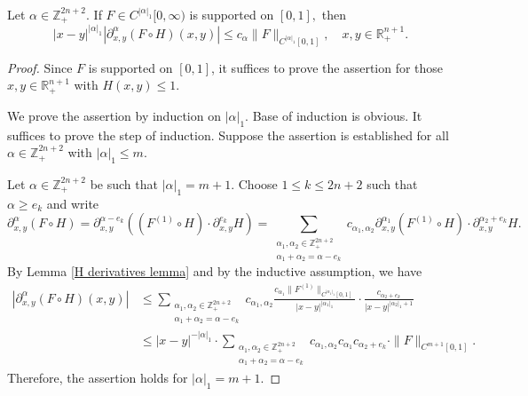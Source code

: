 \documentclass[12pt]{amsart}
\begin{document}
\begin{lemma}\label{pre-parcet lemma} Let $\alpha\in\mathbb{Z}^{2n+2}_+.$ If $F\in C^{|\alpha|_1}[0,\infty)$ is supported on $[0,1],$ then
$$|x-y|^{|\alpha|_1}|\partial_{x,y}^{\alpha}(F\circ H)(x,y)|\leq c_{\alpha}\|F\|_{C^{|\alpha|_1}[0,1]},\quad x,y\in\mathbb{R}^{n+1}_+.$$
\end{lemma}
\begin{proof}
Since $F$ is supported on $[0,1]$, it suffices to prove the assertion for those $x,y\in\mathbb{R}^{n+1}_+$ with $H(x,y)\leq 1.$

We prove the assertion by induction on $|\alpha|_1.$ Base of induction is obvious. It suffices to prove the step of induction. Suppose the assertion is established for all $\alpha\in\mathbb{Z}^{2n+2}_+$ with $|\alpha|_1\leq m.$
	
Let $\alpha\in\mathbb{Z}^{2n+2}_+$ be such that $|\alpha|_1=m+1.$ Choose $1\leq k\leq 2n+2$ such that $\alpha\geq e_k$ and write
$$\partial_{x,y}^{\alpha}(F\circ H)=\partial_{x,y}^{\alpha-e_k}((F^{(1)}\circ H)\cdot \partial_{x,y}^{e_k}H)=\sum_{\substack{\alpha_1,\alpha_2\in\mathbb{Z}^{2n+2}_+\\ \alpha_1+\alpha_2=\alpha-e_k}}c_{\alpha_1,\alpha_2}\partial_{x,y}^{\alpha_1}(F^{(1)}\circ H)\cdot \partial_{x,y}^{\alpha_2+e_k}H.$$
By Lemma \ref{H derivatives lemma} and by the inductive assumption, we have
\begin{align*}
|\partial_{x,y}^{\alpha}(F\circ H)(x,y)|&\leq\sum_{\substack{\alpha_1,\alpha_2\in\mathbb{Z}^{2n+2}_+\\ \alpha_1+\alpha_2=\alpha-e_k}}c_{\alpha_1,\alpha_2}\frac{c_{\alpha_1}\|F^{(1)}\|_{C^{|\alpha_1|_1}[0,1]}}{|x-y|^{|\alpha_1|_1}}\cdot \frac{c_{\alpha_2+e_k}}{|x-y|^{|\alpha_2|_1+1}}\\
&\leq |x-y|^{-|\alpha|_1}\cdot \sum_{\substack{\alpha_1,\alpha_2\in\mathbb{Z}^{2n+2}_+\\ \alpha_1+\alpha_2=\alpha-e_k}}c_{\alpha_1,\alpha_2}c_{\alpha_1}c_{\alpha_2+e_k}\cdot \|F\|_{C^{m+1}[0,1]}.
\end{align*}
Therefore, the assertion holds for $|\alpha|_1=m+1$.
\end{proof}
\end{document}
